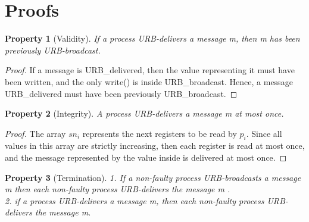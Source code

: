 \documentclass{scrartcl}
\newtheorem{prop}{Property}
\begin{document}
\clearpage
\section{Proofs}
\begin{prop}[Validity]
If a process URB-delivers a message m, then m has been previously URB-broadcast.
\end{prop}

\begin{proof}
If a message is URB\_delivered, then the value representing it must have been written, and the only write() is inside URB\_broadcast. Hence, a message URB\_delivered must have been previously URB\_broadcast.
\end{proof}


\begin{prop}[Integrity]
A process URB-delivers a message m at most once.
\end{prop}

\begin{proof}
The array $sn_i$ represents the next registers to be read by $p_i$. Since all values in this array are strictly increasing, then each register is read at most once, and the message represented by the value inside is delivered at most once.
\end{proof}


\begin{prop}[Termination]
1. If a non-faulty process URB-broadcasts a message m then each non-faulty process URB-delivers the message m . \\
2. if a process URB-delivers a message m, then each non-faulty process URB-delivers the message m.
\end{prop}
\end{document}
